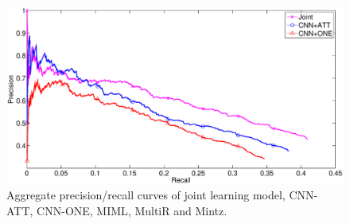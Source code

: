 \documentclass[11pt,a4paper]{article}
\begin{document}
\begin{figure}[t]
\centering
\includegraphics[width=1\columnwidth]{jointcnn.eps}
\caption{Aggregate precision/recall curves of joint learning model, CNN-ATT, CNN-ONE, MIML, MultiR and Mintz.}
\label{fig:jointcnn}
\end{figure} 
\end{document}
